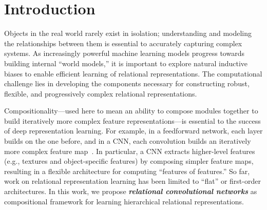 \section{Introduction}\label{sec:intro}

Objects in the real world rarely exist in isolation; understanding and modeling the relationships between them is essential to accurately capturing complex systems. As increasingly powerful machine learning models progress towards building internal ``world models,'' it is important to explore natural inductive biases to enable efficient learning of relational representations. The computational challenge lies in developing the components necessary for constructing robust, flexible, and progressively complex relational representations.


Compositionality---used here to mean an ability to compose modules together to build iteratively more complex feature representations---is essential to the success of deep representation learning. 
 For example, in a feedforward network, each layer builds on the one before, and in a CNN, each convolution builds an iteratively more complex feature map~\citep{zeiler2014visualizing}. 
In particular, a CNN extracts higher-level features (e.g., textures and object-specific features) by composing simpler feature maps, resulting in a flexible architecture for computing ``features of features.''
So far, work on relational representation learning has been limited to ``flat'' or first-order architectures. In this work, we propose \textit{\bfseries relational convolutional networks} as compositional framework for learning hierarchical relational representations.


